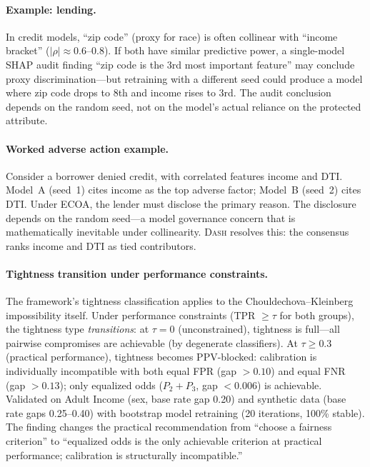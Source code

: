 \documentclass{jmlr}
\newcommand{\DASH}{\textsc{Dash}}
\begin{document}
\paragraph{Example: lending.}
In credit models, ``zip code'' (proxy for race) is often collinear with ``income bracket'' ($|\rho| \approx 0.6$--$0.8$). If both have similar predictive power, a single-model SHAP audit finding ``zip code is the 3rd most important feature'' may conclude proxy discrimination---but retraining with a different seed could produce a model where zip code drops to 8th and income rises to 3rd. The audit conclusion depends on the random seed, not on the model's actual reliance on the protected attribute.

\paragraph{Worked adverse action example.}
Consider a borrower denied credit, with correlated features income and DTI. Model~A (seed~1) cites income as the top adverse factor; Model~B (seed~2) cites DTI. Under ECOA, the lender must disclose the primary reason. The disclosure depends on the random seed---a model governance concern that is mathematically inevitable under collinearity. \DASH{} resolves this: the consensus ranks income and DTI as tied contributors.

\paragraph{Tightness transition under performance constraints.}
The framework's tightness classification applies to the Chouldechova--Kleinberg impossibility itself. Under performance constraints (TPR $\geq \tau$ for both groups), the tightness type \emph{transitions}: at $\tau = 0$ (unconstrained), tightness is full---all pairwise compromises are achievable (by degenerate classifiers). At $\tau \geq 0.3$ (practical performance), tightness becomes PPV-blocked: calibration is individually incompatible with both equal FPR (gap $> 0.10$) and equal FNR (gap $> 0.13$); only equalized odds ($P_2{+}P_3$, gap $< 0.006$) is achievable. Validated on Adult Income (sex, base rate gap 0.20) and synthetic data (base rate gaps 0.25--0.40) with bootstrap model retraining (20 iterations, 100\% stable). The finding changes the practical recommendation from ``choose a fairness criterion'' to ``equalized odds is the only achievable criterion at practical performance; calibration is structurally incompatible.''
\end{document}
